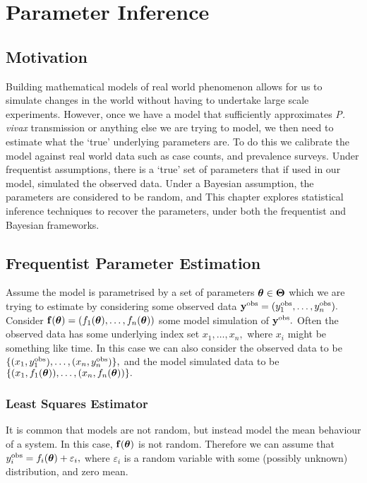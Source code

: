 \chapter{Parameter Inference}

\section{Motivation}

Building mathematical models of real world phenomenon allows for us to
simulate changes in the world without having to undertake large scale
experiments. However, once we have a model that sufficiently approximates
\emph{P. vivax} transmission
or anything else we are trying to model,
we then need to estimate what the `true' underlying parameters are.
To do this we calibrate the model against real world data such as case counts,
and prevalence surveys. Under frequentist assumptions, there is a `true' set of
parameters that if used in our model, simulated the observed data. Under a Bayesian 
assumption, the parameters are considered to be random, and
This chapter explores statistical inference techniques to recover the 
parameters, under both the frequentist and Bayesian frameworks.

\section{Frequentist Parameter Estimation}

Assume the model is parametrised by a set of parameters
$\bm{\theta} \in \mathbf{\Theta}$ which
we are trying to estimate by considering some observed data
$\mathbf{y}^{\mathrm{obs}} = (y_1^{\mathrm{obs}}, \dots, y_n^{\mathrm{obs}}).$
Consider $\mathbf{f}(\bm{\theta}) = (f_1(\bm{\theta}), \dots, f_n(\bm{\theta}))$
some model simulation of
$\mathbf{y}^{\mathrm{obs}}.$ Often the observed data has some underlying index set
$x_1, \dots, x_n,$ where $x_i$ might be something like time. In this case
we can also consider the observed data to be
$\{(x_1, y_1^{\mathrm{obs}}), \dots, (x_n, y_n^{\mathrm{obs}})\},$ and the
model simulated data to be
$\{(x_1, f_1(\bm{\theta})), \dots, (x_n, f_n(\bm{\theta}))\}.$

\subsection*{Least Squares Estimator}

It is common that models are not random, but instead model the mean behaviour
of a system. In this case, $\mathbf{f}(\bm{\theta})$ is not random. Therefore
we can assume that $y^{\mathrm{obs}}_i = f_i(\bm{\theta}) + \varepsilon_i,$
where $\varepsilon_i$ is a random variable with some (possibly unknown)
distribution, and zero mean.

